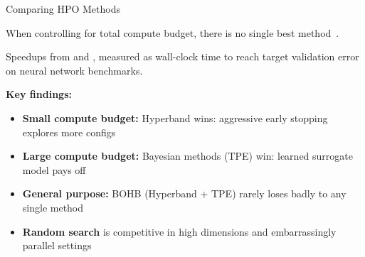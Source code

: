 \begin{frame}{Comparing HPO Methods}

  When controlling for total compute budget, there is no single best method~\cite{falkner2018bohb}.

  \vspace{0.3em}
  \begin{center}
    \renewcommand{\arraystretch}{1.3}
  \end{center}
  {\scriptsize Speedups from \cite{li2017hyperband} and \cite{falkner2018bohb}, measured as wall-clock time to reach target validation error on neural network benchmarks.}

  \vspace{0.3em}
  \textbf{Key findings:}
  \begin{itemize}
    \item \textbf{Small compute budget:} Hyperband wins: aggressive early stopping explores more configs
    \item \textbf{Large compute budget:} Bayesian methods (TPE) win: learned surrogate model pays off
    \item \textbf{General purpose:} BOHB (Hyperband + TPE) rarely loses badly to any single method
    \item \textbf{Random search} is competitive in high dimensions and embarrassingly parallel settings
  \end{itemize}

\end{frame}


